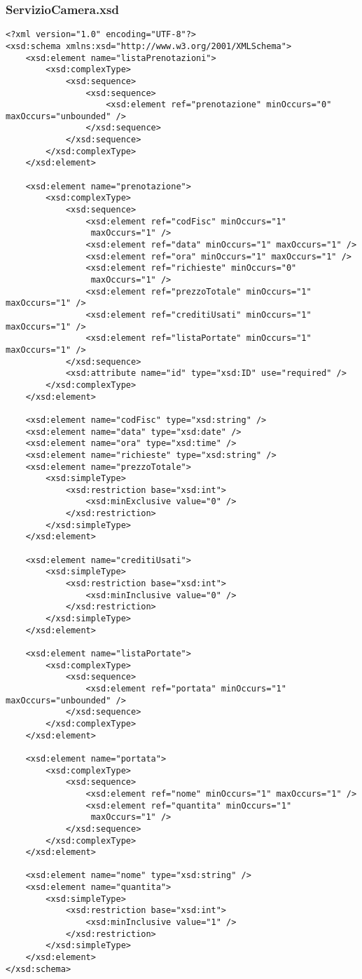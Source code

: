 \documentclass [a4paper, 12pt]{book}
\begin{document}
\subsubsection{ServizioCamera.xsd}
\begin{lstlisting}[style=XML]
<?xml version="1.0" encoding="UTF-8"?>
<xsd:schema xmlns:xsd="http://www.w3.org/2001/XMLSchema">
    <xsd:element name="listaPrenotazioni">
        <xsd:complexType>
            <xsd:sequence>
                <xsd:sequence>
                    <xsd:element ref="prenotazione" minOccurs="0" maxOccurs="unbounded" />
                </xsd:sequence>
            </xsd:sequence>
        </xsd:complexType>
    </xsd:element>

    <xsd:element name="prenotazione">
        <xsd:complexType>
            <xsd:sequence>
                <xsd:element ref="codFisc" minOccurs="1"
                 maxOccurs="1" />
                <xsd:element ref="data" minOccurs="1" maxOccurs="1" />
                <xsd:element ref="ora" minOccurs="1" maxOccurs="1" />
                <xsd:element ref="richieste" minOccurs="0"
                 maxOccurs="1" />
                <xsd:element ref="prezzoTotale" minOccurs="1" maxOccurs="1" />
                <xsd:element ref="creditiUsati" minOccurs="1" maxOccurs="1" />
                <xsd:element ref="listaPortate" minOccurs="1" maxOccurs="1" />
            </xsd:sequence>
            <xsd:attribute name="id" type="xsd:ID" use="required" />
        </xsd:complexType>
    </xsd:element>

    <xsd:element name="codFisc" type="xsd:string" />
    <xsd:element name="data" type="xsd:date" />
    <xsd:element name="ora" type="xsd:time" />
    <xsd:element name="richieste" type="xsd:string" />
    <xsd:element name="prezzoTotale">
        <xsd:simpleType>
            <xsd:restriction base="xsd:int">
                <xsd:minExclusive value="0" />
            </xsd:restriction>
        </xsd:simpleType>
    </xsd:element>

    <xsd:element name="creditiUsati">
        <xsd:simpleType>
            <xsd:restriction base="xsd:int">
                <xsd:minInclusive value="0" />
            </xsd:restriction>
        </xsd:simpleType>
    </xsd:element>

    <xsd:element name="listaPortate">
        <xsd:complexType>
            <xsd:sequence>
                <xsd:element ref="portata" minOccurs="1" maxOccurs="unbounded" />
            </xsd:sequence>
        </xsd:complexType>
    </xsd:element>

    <xsd:element name="portata">
        <xsd:complexType>
            <xsd:sequence>
                <xsd:element ref="nome" minOccurs="1" maxOccurs="1" />
                <xsd:element ref="quantita" minOccurs="1"
                 maxOccurs="1" />
            </xsd:sequence>
        </xsd:complexType>
    </xsd:element>

    <xsd:element name="nome" type="xsd:string" />
    <xsd:element name="quantita">
        <xsd:simpleType>
            <xsd:restriction base="xsd:int">
                <xsd:minInclusive value="1" />
            </xsd:restriction>
        </xsd:simpleType>
    </xsd:element>
</xsd:schema>
\end{lstlisting}
\end{document}

